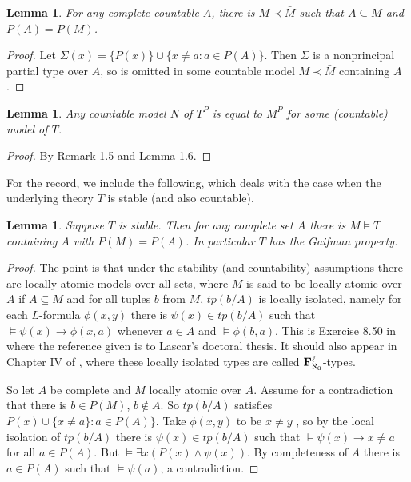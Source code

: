 \documentclass[12pt]{article}
\newtheorem{Lemma}[Theorem]{Lemma}
\begin{document}
\begin{Lemma} For any complete countable $A$, there is $M\prec {\bar M}$ such that $A\subseteq M$ and $P(A) = P(M)$.
\end{Lemma}
\begin{proof} Let $\Sigma(x) = \{P(x)\}\cup \{x\neq a: a\in P(A)\}$.  Then $\Sigma$ is a nonprincipal partial type over $A$, so is omitted in some countable model $M\prec {\bar M}$ containing $A$. 
\end{proof}

\begin{Lemma} Any countable model $N$ of $T^{P}$ is equal to $M^{P}$ for some (countable) model of $T$. 
\end{Lemma}
\begin{proof} By Remark 1.5 and Lemma 1.6.
\end{proof}

For the record, we include the following,  which deals with the case when the underlying theory $T$ is stable (and also countable).
\begin{Lemma} Suppose $T$ is stable. Then   for any complete set $A$ there is $M\models T$ containing $A$ with $P(M) = P(A)$. In particular $T$ has the Gaifman property. 
\end{Lemma} 
\begin{proof} The point is that  under the stability (and countability)  assumptions there are locally atomic models over all sets, where $M$ is said to be locally atomic over $A$ if $A\subseteq M$ and for all tuples $b$ from $M$, $tp(b/A)$ is locally isolated, namely for  each $L$-formula $\phi(x,y)$ there is  $\psi(x)\in tp(b/A)$ such that $\models \psi(x) \to \phi(x,a)$ whenever $a\in A$ and $\models \phi(b,a)$.
This is Exercise 8.50 in \cite{Pillay-intro} where the reference given  is to Lascar's doctoral thesis.  It should also appear in Chapter IV of \cite{Shelah-classification}, where these locally isolated types are called ${\bf F}^{\ell}_{\aleph_{0}}$-types.

So let $A$ be complete and $M$ locally atomic over $A$. Assume for a contradiction that there is $b\in P(M)$, $b\notin A$. So $tp(b/A)$ satisfies $P(x) \cup \{x\neq a\}:a\in P(A)\}$. Take $\phi(x,y)$ to be $x\neq y$ , so by the local isolation of $tp(b/A)$ there is $\psi(x)\in tp(b/A)$ such that $\models \psi(x) \to x\neq a$ for all $a\in P(A)$.  But $\models\exists x(P(x)\wedge \psi(x))$. By completeness of $A$ there is $a\in P(A)$ such that $\models \psi(a)$, a contradiction. 
\end{proof} 
\end{document}
